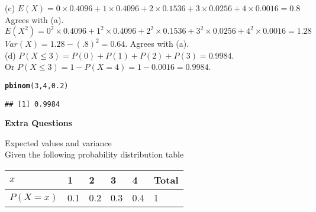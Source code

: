 \documentclass[bigtut]{tutorial}\usepackage[]{graphicx}\usepackage[]{color}
\makeatletter
\newcommand{\hlnum}[1]{\textcolor[rgb]{0.686,0.059,0.569}{#1}}%
\newcommand{\hlstd}[1]{\textcolor[rgb]{0.345,0.345,0.345}{#1}}%
\newcommand{\hlkwd}[1]{\textcolor[rgb]{0.737,0.353,0.396}{\textbf{#1}}}%
\newenvironment{kframe}{%
 \def\at@end@of@kframe{}%
 \ifinner\ifhmode%
  \def\at@end@of@kframe{\end{minipage}}%
  \begin{minipage}{\columnwidth}%
 \fi\fi%
 \def\FrameCommand##1{\hskip\@totalleftmargin \hskip-\fboxsep
 \colorbox{shadecolor}{##1}\hskip-\fboxsep
     \hskip-\linewidth \hskip-\@totalleftmargin \hskip\columnwidth}%
 \MakeFramed {\advance\hsize-\width
   \@totalleftmargin\z@ \linewidth\hsize
   \@setminipage}}%
 {\par\unskip\endMakeFramed%
 \at@end@of@kframe}
\newenvironment{knitrout}{}{} %
\makeatother
\begin{document}
\begin{tutorial}
\begin{questions}
\begin{solution}
\vspace{.5cm}
(c)
$E(X) = 0 \times 0.4096 + 1 \times 0.4096 + 2 \times 
0.1536 + 3 \times 0.0256 + 4 \times 0.0016 = 0.8$ \\
Agrees with (a). \\

$E(X^2) = 0^2 \times 0.4096 + 1^2 \times 0.4096 + 2^2 \times  0.1536 + 3^2 \times 0.0256 + 4^2 \times 0.0016 = 1.28$ \\

$Var(X) = 1.28 - (.8)^2 =0.64$.
Agrees with (a). \\


\vspace{.5cm}
(d)
$P (X \leq 3) = P(0) + P(1) + P(2) + P(3) = 0.9984 $. \\ 
Or $P (X \leq 3) = 1-P(X=4) = 1-0.0016 =0.9984 $.

\begin{knitrout}
\color{fgcolor}\begin{kframe}
\begin{alltt}
\hlkwd{pbinom}\hlstd{(}\hlnum{3}\hlstd{,}\hlnum{4}\hlstd{,}\hlnum{0.2}\hlstd{)}
\end{alltt}
\begin{verbatim}
## [1] 0.9984
\end{verbatim}
\end{kframe}
\end{knitrout}
\end{solution}


\newpage
\hspace{-1cm} {\bf Extra Questions}

\question Expected values and variance \\

Given the following probability distribution table

\begin{center}
\begin{tabular}{| l | l | l | l | l | l |} \hline
$x$ & 1 \hspace{1cm}  & 2 \hspace{1cm} & 3 \hspace{1cm} & 4 \hspace{1cm}  &  Total \\ \hline
$P(X=x)$ & 0.1 & 0.2 & 0.3 & 0.4 & 1 \\ \hline
\end{tabular}
\end{center}

\begin{parts}


\end{parts}
\end{questions}
\end{tutorial}
\end{document}
